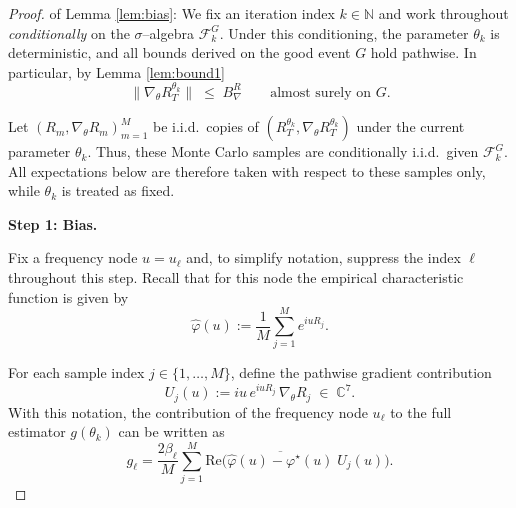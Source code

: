 \documentclass[10pt,a4paper]{amsart}
\newcommand\cF{\mathcal F}
\begin{document}
\begin{proof}
of Lemma \ref{lem:bias}: We fix an iteration index $k\in\mathbb N$ and work throughout \emph{conditionally} on the
$\sigma$--algebra $\cF_k^G$.
Under this conditioning, the parameter $\theta_k$ is deterministic, and all bounds derived
on the good event $G$ hold pathwise.
In particular, by Lemma \ref{lem:bound1}
\[
\|\nabla_\theta R_T^{\theta_k}\|\;\le\; B_\nabla^R
\qquad\text{almost surely on } G.
\]

Let $(R_m,\nabla_\theta R_m)_{m=1}^M$ be i.i.d.\ copies of
$(R_T^{\theta_k},\nabla_\theta R_T^{\theta_k})$ under the current parameter $\theta_k$. Thus, these Monte Carlo samples are conditionally i.i.d.\ given $\cF_k^G$. All expectations below are therefore taken with respect to these samples only, while $\theta_k$ is treated as fixed.

\medskip
\noindent\textbf{Step 1: Bias.}

Fix a frequency node $u=u_\ell$ and, to simplify notation, suppress the index $\ell$
throughout this step.
Recall that for this node the empirical characteristic function is given by
\[
\widehat\varphi(u)
:=
\frac1M\sum_{j=1}^M e^{iu R_j}.
\]

For each sample index $j\in\{1,\dots,M\}$, define the pathwise gradient contribution
\[
U_j(u)
:=
iu\,e^{iu R_j}\,\nabla_\theta R_j
\;\in\;\mathbb{C}^7.
\]
With this notation, the contribution of the frequency node $u_\ell$ to the full estimator
$g(\theta_k)$ can be written as
\[
g_\ell
=
\frac{2\beta_\ell}{M}\sum_{j=1}^M
\text{Re}\Big(
\overline{\widehat\varphi(u)-\varphi^\star(u)}\;
U_j(u)
\Big).
\]


\end{proof}
\end{document}
